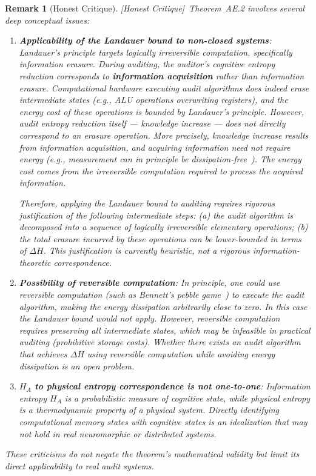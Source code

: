 \documentclass[12pt,a4paper]{article}
\newtheorem{remark}[theorem]{Remark}
\newcommand{\hcritique}{\textcolor{blue!60!black}{\small\textsf{[Honest Critique]}}}
\begin{document}
\begin{remark}[Honest Critique]
\label{crit:ae2}
\hcritique~Theorem~AE.2 involves several deep conceptual issues:
\begin{enumerate}
    \item \textbf{Applicability of the Landauer bound to non-closed systems}: Landauer's principle targets logically irreversible computation, specifically information erasure. During auditing, the auditor's cognitive entropy reduction corresponds to \textbf{information acquisition} rather than information erasure. Computational hardware executing audit algorithms does indeed erase intermediate states (e.g., ALU operations overwriting registers), and the energy cost of these operations is bounded by Landauer's principle. However, audit entropy reduction itself --- knowledge increase --- does not directly correspond to an erasure operation. More precisely, knowledge increase results from information acquisition, and acquiring information need not require energy (e.g., measurement can in principle be dissipation-free~\citep{bennett2003notes}). The energy cost comes from the irreversible computation required to process the acquired information.

    Therefore, applying the Landauer bound to auditing requires rigorous justification of the following intermediate steps: (a) the audit algorithm is decomposed into a sequence of logically irreversible elementary operations; (b) the total erasure incurred by these operations can be lower-bounded in terms of $\Delta H$. This justification is currently heuristic, not a rigorous information-theoretic correspondence.

    \item \textbf{Possibility of reversible computation}: In principle, one could use reversible computation (such as Bennett's pebble game~\citep{bennett2003notes}) to execute the audit algorithm, making the energy dissipation arbitrarily close to zero. In this case the Landauer bound would not apply. However, reversible computation requires preserving all intermediate states, which may be infeasible in practical auditing (prohibitive storage costs). Whether there exists an audit algorithm that achieves $\Delta H$ using reversible computation while avoiding energy dissipation is an open problem.

    \item \textbf{$H_A$ to physical entropy correspondence is not one-to-one}: Information entropy $H_A$ is a probabilistic measure of cognitive state, while physical entropy is a thermodynamic property of a physical system. Directly identifying computational memory states with cognitive states is an idealization that may not hold in real neuromorphic or distributed systems.
\end{enumerate}
These criticisms do not negate the theorem's mathematical validity but limit its direct applicability to real audit systems.
\end{remark}
\end{document}
